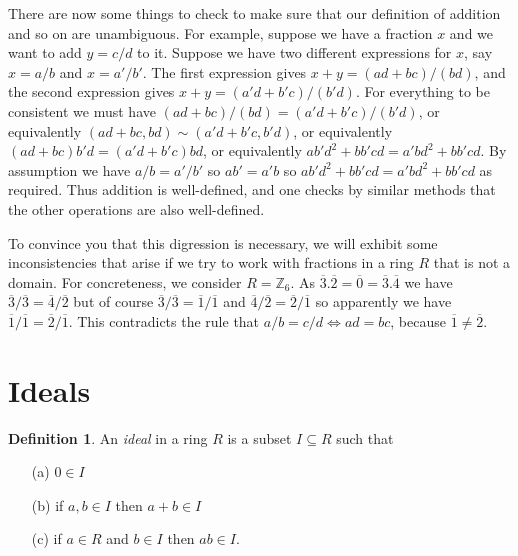 \documentclass{amsart}
\newcommand{\Z}         {{\mathbb{Z}}}
\newcommand{\ov}[1]     {\overline{#1}}
\newcommand{\sse}       {\subseteq}
\newcommand{\iffa}      {\Leftrightarrow}
\renewcommand{\:}{\colon}
\theoremstyle{definition}
\newtheorem{definition}[theorem]{Definition}
\begin{document}
There are now some things to check to make sure that our definition of
addition and so on are unambiguous.  For example, suppose we have a
fraction $x$ and we want to add $y=c/d$ to it.  Suppose we have two
different expressions for $x$, say $x=a/b$ and $x=a'/b'$.  The first
expression gives $x+y=(ad+bc)/(bd)$, and the second expression gives
$x+y=(a'd+b'c)/(b'd)$.  For everything to be consistent we must have
$(ad+bc)/(bd)=(a'd+b'c)/(b'd)$, or equivalently
$(ad+bc,bd)\sim(a'd+b'c,b'd)$, or equivalently
$(ad+bc)b'd=(a'd+b'c)bd$, or equivalently $ab'd^2+bb'cd=a'bd^2+bb'cd$.
By assumption we have $a/b=a'/b'$ so $ab'=a'b$ so
$ab'd^2+bb'cd=a'bd^2+bb'cd$ as required.  Thus addition is
well-defined, and one checks by similar methods that the other
operations are also well-defined.

To convince you that this digression is necessary, we will exhibit
some inconsistencies that arise if we try to work with fractions in a
ring $R$ that is not a domain.  For concreteness, we consider
$R=\Z_6$.  As $\ov{3}.\ov{2}=\ov{0}=\ov{3}.\ov{4}$ we have
$\ov{3}/\ov{3}=\ov{4}/\ov{2}$ but of course
$\ov{3}/\ov{3}=\ov{1}/\ov{1}$ and $\ov{4}/\ov{2}=\ov{2}/\ov{1}$ so
apparently we have $\ov{1}/\ov{1}=\ov{2}/\ov{1}$.  This contradicts
the rule that $a/b=c/d\iffa ad=bc$, because $\ov{1}\neq\ov{2}$.  

\section{Ideals}

\begin{definition}
 An \emph{ideal} in a ring $R$ is a subset $I\sse R$ such that
 \begin{itemize}
 \item[(a)] $0\in I$
 \item[(b)] if $a,b\in I$ then $a+b\in I$
 \item[(c)] if $a\in R$ and $b\in I$ then $ab\in I$. 
 \end{itemize}
\end{definition}
\end{document}
